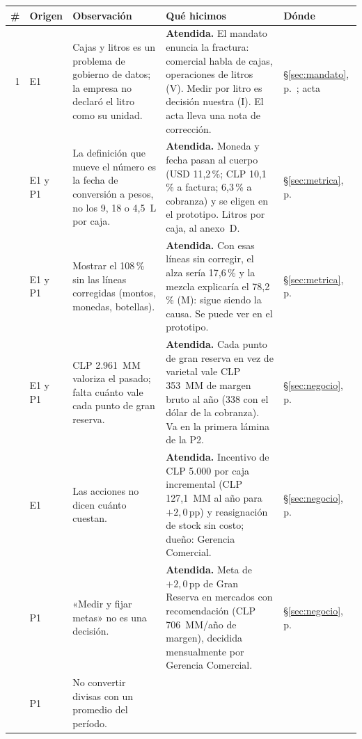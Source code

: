\begin{center}
\footnotesize
\renewcommand{\arraystretch}{1.0}
\begin{tabularx}{\textwidth}{@{}r P{0.95cm} L L P{1.35cm}@{}}
\toprule
\# & \textbf{Origen} & \textbf{Observación} & \textbf{Qué hicimos} & \textbf{Dónde} \\
 & E1 &
Cajas y litros es un problema de gobierno de datos; la empresa no declaró el litro como su unidad. &
\textbf{Atendida.} El mandato enuncia la fractura: comercial habla de cajas, operaciones de litros (V). Medir por litro es decisión nuestra (I). El acta lleva una nota de corrección. &
§\ref{sec:mandato}, p.~\pageref{sec:mandato}; acta \\
 & E1 y P1 &
La definición que mueve el número es la fecha de conversión a pesos, no los 9, 18 o 4,5~L por caja. &
\textbf{Atendida.} Moneda y fecha pasan al cuerpo (USD 11,2\,\%; CLP 10,1\,\% a factura; 6,3\,\% a cobranza) y se eligen en el prototipo. Litros por caja, al anexo~D. &
§\ref{sec:metrica}, p.~\pageref{par:fecha_dolar} \\
 & E1 y P1 &
Mostrar el 108\,\% sin las líneas corregidas (montos, monedas, botellas). &
\textbf{Atendida.} Con esas líneas sin corregir, el alza sería 17,6\,\% y la mezcla explicaría el 78,2\,\% (M): sigue siendo la causa. Se puede ver en el prototipo. &
§\ref{sec:metrica}, p.~\pageref{tab:sensibilidades} \\
 & E1 y P1 &
CLP 2.961~MM valoriza el pasado; falta cuánto vale cada punto de gran reserva. &
\textbf{Atendida.} Cada punto de gran reserva en vez de varietal vale CLP 353~MM de margen bruto al año (338 con el dólar de la cobranza). Va en la primera lámina de la P2. &
§\ref{sec:negocio}, p.~\pageref{sec:negocio} \\
 & E1 &
Las acciones no dicen cuánto cuestan. &
\textbf{Atendida.} Incentivo de CLP 5.000 por caja incremental (CLP 127,1~MM al año para $+2,0$\,pp) y reasignación de stock sin costo; dueño: Gerencia Comercial. &
§\ref{sec:negocio}, p.~\pageref{par:recomendacion} \\
 & P1 &
«Medir y fijar metas» no es una decisión. &
\textbf{Atendida.} Meta de $+2,0$\,pp de Gran Reserva en mercados con recomendación (CLP 706~MM/año de margen), decidida mensualmente por Gerencia Comercial. &
§\ref{sec:negocio}, p.~\pageref{par:recomendacion} \\
 & P1 &
No convertir divisas con un promedio del período. &

\end{tabularx}
\end{center}
